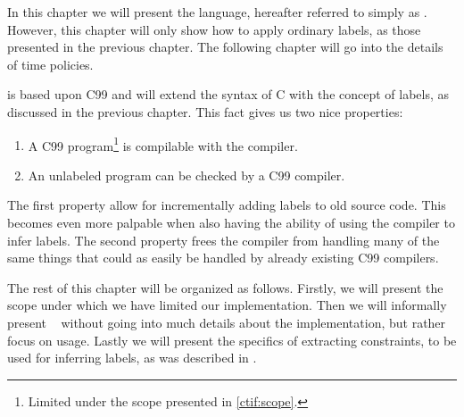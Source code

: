 
In this chapter we will present the \thelanglong{} language, hereafter referred to simply as \thelang.
However, this chapter will only show how to apply ordinary labels, as those presented in the previous chapter.
The following chapter will go into the details of time policies.

\thelang{} is based upon C99 and will extend the syntax of C with the concept of labels, as discussed in the previous chapter.
This fact gives us two nice properties:
\begin{enumerate}
  \item A C99 program\footnote{Limited under the scope presented in \cref{ctif:scope}.} is compilable with the \thelang{} compiler.
  \item An unlabeled \thelang{} program can be checked by a C99 compiler.
\end{enumerate}
The first property allow for incrementally adding labels to old source code.
This becomes even more palpable when also having the ability of using the \thelang{} compiler to infer labels.
The second property frees the \thelang{} compiler from handling many of the same things that could as easily be handled by already existing C99 compilers.

The rest of this chapter will be organized as follows.
Firstly, we will present the scope under which we have limited our implementation.
Then we will informally present \thelang~ without going into much details about the implementation, but rather focus on usage.
Lastly we will present the specifics of extracting constraints, to be used for inferring labels, as was described in .
